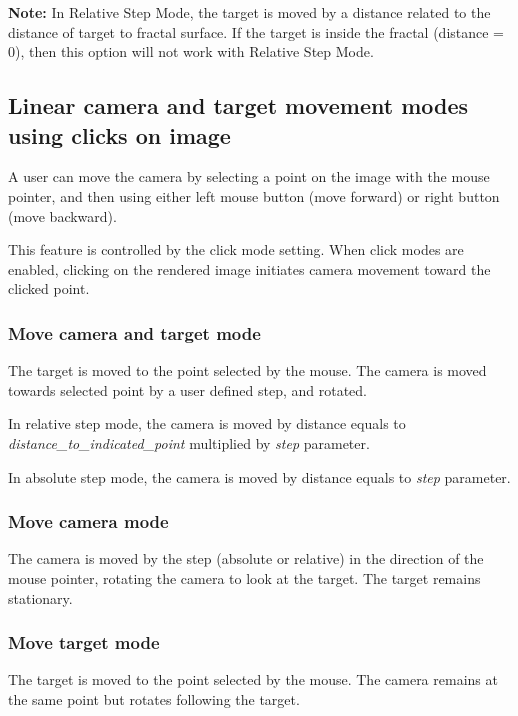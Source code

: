 \textbf{Note:} In Relative Step Mode, the target is moved by a distance related to the distance of target to fractal surface. If the target is inside the fractal (distance = 0), then this option will not work with Relative Step Mode.

\subsection{Linear camera and target movement modes using clicks on image}\label{linear-camera-and-target-movement-modes-using-the-mouse-pointer}

A user can move the camera by selecting a point on the image with the mouse pointer, and then using either left mouse button (move forward) or right button (move backward).

This feature is controlled by the click mode setting. When click modes are enabled, clicking on the rendered image initiates camera movement toward the clicked point.

\subsubsection{Move camera and target mode}\label{move-camera-and-target-mode-1}

The target is moved to the point selected by the mouse. The camera is moved towards selected point by a user defined step, and rotated.

In relative step mode, the camera is moved by distance equals to
\emph{distance\_to\_indicated\_point} multiplied by \emph{step} parameter.

In absolute step mode, the camera is moved by distance equals to \emph{step}
parameter.

\subsubsection{Move camera mode}\label{move-camera-mode-1}

The camera is moved by the step (absolute or relative) in the direction of the
mouse pointer, rotating the camera to look at the target. The target remains
stationary.

\subsubsection{Move target mode}\label{move-target-mode-1}

The target is moved to the point selected by the mouse. The camera remains at
the same point but rotates following the target.

